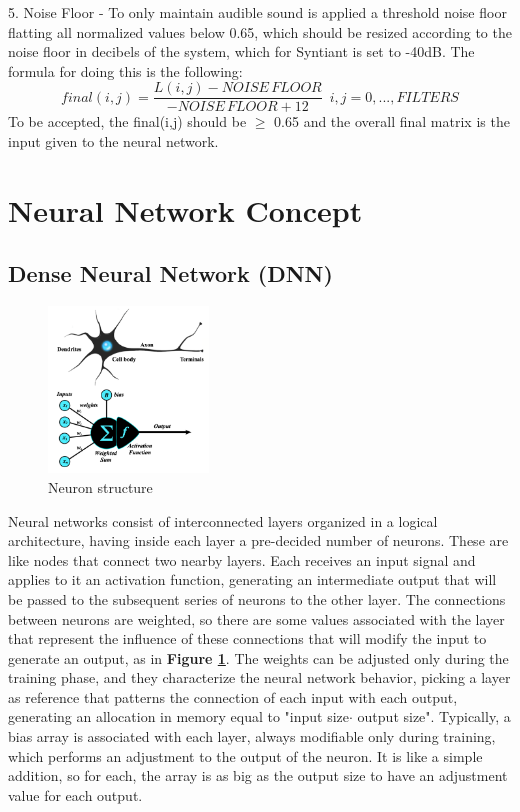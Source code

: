5. Noise Floor - To only maintain audible sound is applied a threshold noise floor flatting all normalized values below 0.65, which should be resized according to the noise floor in decibels of the system, which for Syntiant is set to -40dB. The formula for doing this is the following:
\begin{equation}
    final(i,j)=\frac{L(i,j)-NOISE\,FLOOR}{-NOISE\,FLOOR+12}\,\,\,i,j=0,...,FILTERS
\end{equation}
To be accepted, the final(i,j) should be $\geq$ 0.65 and the overall final matrix is the input given to the neural network.
\section{Neural Network Concept}
\subsection{Dense Neural Network (DNN)}
\begin{figure}
  \begin{center}
    \includegraphics[width=0.38\textwidth]{images/2.04 Neuron.png}
  \end{center}
  \caption{Neuron structure \cite{ULLAH2024100834}}
  \label{fig:neuron structure}
\end{figure}
Neural networks consist of interconnected layers organized in a logical architecture, having inside each layer a pre-decided number of neurons\cite{neural_network_theory}. These are like nodes that connect two nearby layers. Each receives an input signal and applies to it an activation function, generating an intermediate output that will be passed to the subsequent series of neurons to the other layer. The connections between neurons are weighted, so there are some values associated with the layer that represent the influence of these connections that will modify the input to generate an output, as in \textbf{Figure \ref{fig:neuron structure}}. The weights can be adjusted only during the training phase, and they characterize the neural network behavior, picking a layer as reference that patterns the connection of each input with each output, generating an allocation in memory equal to "input size$\cdot$ output size". Typically, a bias array is associated with each layer, always modifiable only during training, which performs an adjustment to the output of the neuron. It is like a simple addition, so for each, the array is as big as the output size to have an adjustment value for each output.\newline
